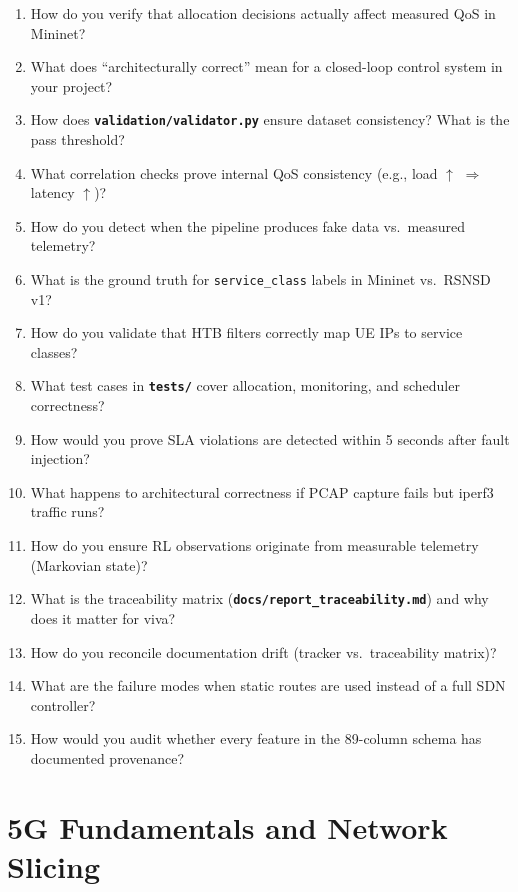 \documentclass[11pt,a4paper]{article}
\newcommand{\proj}[1]{\textbf{\texttt{#1}}}
\begin{document}
\begin{enumerate}
    \item How do you verify that allocation decisions actually affect measured QoS in Mininet?
    \item What does ``architecturally correct'' mean for a closed-loop control system in your project?
    \item How does \proj{validation/validator.py} ensure dataset consistency? What is the pass threshold?
    \item What correlation checks prove internal QoS consistency (e.g., load $\uparrow$ $\Rightarrow$ latency $\uparrow$)?
    \item How do you detect when the pipeline produces fake data vs.\ measured telemetry?
    \item What is the ground truth for \texttt{service\_class} labels in Mininet vs.\ RSNSD v1?
    \item How do you validate that HTB filters correctly map UE IPs to service classes?
    \item What test cases in \proj{tests/} cover allocation, monitoring, and scheduler correctness?
    \item How would you prove SLA violations are detected within 5 seconds after fault injection?
    \item What happens to architectural correctness if PCAP capture fails but iperf3 traffic runs?
    \item How do you ensure RL observations originate from measurable telemetry (Markovian state)?
    \item What is the traceability matrix (\proj{docs/report\_traceability.md}) and why does it matter for viva?
    \item How do you reconcile documentation drift (tracker vs.\ traceability matrix)?
    \item What are the failure modes when static routes are used instead of a full SDN controller?
    \item How would you audit whether every feature in the 89-column schema has documented provenance?
\end{enumerate}

\section{5G Fundamentals and Network Slicing}
\end{document}
